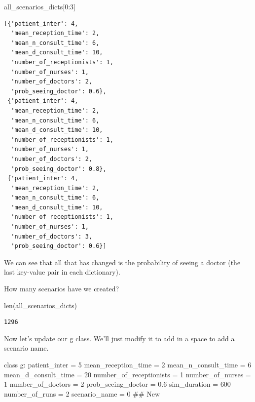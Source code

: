 \documentclass[
  letterpaper,
  DIV=11,
  numbers=noendperiod]{scrreprt}
\newenvironment{Shaded}{\begin{snugshade}}{\end{snugshade}}
\newcommand{\BuiltInTok}[1]{\textcolor[rgb]{0.00,0.23,0.31}{#1}}
\newcommand{\CommentTok}[1]{\textcolor[rgb]{0.37,0.37,0.37}{#1}}
\newcommand{\DecValTok}[1]{\textcolor[rgb]{0.68,0.00,0.00}{#1}}
\newcommand{\FloatTok}[1]{\textcolor[rgb]{0.68,0.00,0.00}{#1}}
\newcommand{\KeywordTok}[1]{\textcolor[rgb]{0.00,0.23,0.31}{#1}}
\newcommand{\NormalTok}[1]{\textcolor[rgb]{0.00,0.23,0.31}{#1}}
\newcommand{\OperatorTok}[1]{\textcolor[rgb]{0.37,0.37,0.37}{#1}}
\begin{document}
\begin{Shaded}
\begin{Highlighting}[]
\NormalTok{all\_scenarios\_dicts[}\DecValTok{0}\NormalTok{:}\DecValTok{3}\NormalTok{]}
\end{Highlighting}
\end{Shaded}

\begin{verbatim}
[{'patient_inter': 4,
  'mean_reception_time': 2,
  'mean_n_consult_time': 6,
  'mean_d_consult_time': 10,
  'number_of_receptionists': 1,
  'number_of_nurses': 1,
  'number_of_doctors': 2,
  'prob_seeing_doctor': 0.6},
 {'patient_inter': 4,
  'mean_reception_time': 2,
  'mean_n_consult_time': 6,
  'mean_d_consult_time': 10,
  'number_of_receptionists': 1,
  'number_of_nurses': 1,
  'number_of_doctors': 2,
  'prob_seeing_doctor': 0.8},
 {'patient_inter': 4,
  'mean_reception_time': 2,
  'mean_n_consult_time': 6,
  'mean_d_consult_time': 10,
  'number_of_receptionists': 1,
  'number_of_nurses': 1,
  'number_of_doctors': 3,
  'prob_seeing_doctor': 0.6}]
\end{verbatim}

We can see that all that has changed is the probability of seeing a
doctor (the last key-value pair in each dictionary).

How many scenarios have we created?

\begin{Shaded}
\begin{Highlighting}[]
\BuiltInTok{len}\NormalTok{(all\_scenarios\_dicts)}
\end{Highlighting}
\end{Shaded}

\begin{verbatim}
1296
\end{verbatim}

Now let's update our g class. We'll just modify it to add in a space to
add a scenario name.

\begin{Shaded}
\begin{Highlighting}[]
\KeywordTok{class}\NormalTok{ g:}
\NormalTok{    patient\_inter }\OperatorTok{=} \DecValTok{5}
\NormalTok{    mean\_reception\_time }\OperatorTok{=} \DecValTok{2}
\NormalTok{    mean\_n\_consult\_time }\OperatorTok{=} \DecValTok{6}
\NormalTok{    mean\_d\_consult\_time }\OperatorTok{=} \DecValTok{20}
\NormalTok{    number\_of\_receptionists }\OperatorTok{=} \DecValTok{1}
\NormalTok{    number\_of\_nurses }\OperatorTok{=} \DecValTok{1}
\NormalTok{    number\_of\_doctors }\OperatorTok{=} \DecValTok{2}
\NormalTok{    prob\_seeing\_doctor }\OperatorTok{=} \FloatTok{0.6}
\NormalTok{    sim\_duration }\OperatorTok{=} \DecValTok{600}
\NormalTok{    number\_of\_runs }\OperatorTok{=} \DecValTok{2}
\NormalTok{    scenario\_name }\OperatorTok{=} \DecValTok{0} \CommentTok{\#\# New}
\end{Highlighting}
\end{Shaded}
\end{document}
